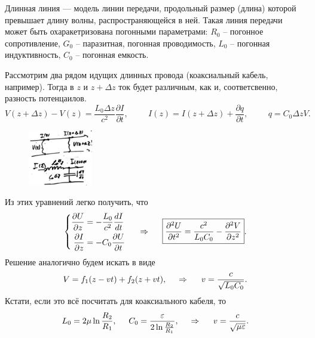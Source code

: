 Длинная линия — модель линии передачи, продольный размер (длина) которой превышает длину волны, распространяющейся в ней. Такая линия передачи может быть охаракетризована погонными параметрами:
$R_0$ -- погонное сопротивление, $G_0$ -- паразитная, погонная проводимость, $L_0$ -- погонная индуктивность, $C_0$ -- погонная емкость.


Рассмотрим два рядом идущих длинных провода (коаксиальный кабель, например). Тогда в $z$ и $z+ \Delta z$ ток будет различным, как и, соответсвенно, разность потенцаилов. 
\begin{equation*}
    V(z+\Delta z) - V(z) = \frac{L_0 \Delta z}{c^2} \frac{\partial I}{\partial t},
    \hspace{1cm} 
    I(z) = I(z+\Delta z) + \frac{\partial q}{\partial t},
    \hspace{1cm} 
    q = C_0 \Delta z V.
\end{equation*}

\begin{figure}[h]
    \centering
    \includegraphics[width=0.25\textwidth]{img/2.png}
\end{figure}

\noindent
Из этих уравнений легко получить, что
\begin{equation}
    \left\{\begin{aligned}
        \frac{\partial U}{\partial z} &= - \frac{L_0}{c^2} \frac{d I}{d t} \\
        \frac{\partial I}{\partial z} &= - C_0 \frac{\partial U}{\partial t} 
    \end{aligned}\right.
    \hspace{0.5cm} \Rightarrow \hspace{0.5cm} 
    \boxed{
        \frac{\partial^2 U}{\partial t^2}  = \frac{c^2}{L_0 C_0} - \frac{\partial^2 V}{\partial z^2} 
    }.
\end{equation}
Решение аналогично будем искать в виде
\begin{equation}
    V = f_1 (z - vt) + f_2 (z + vt),
    \hspace{0.5cm} \Rightarrow \hspace{0.5cm} 
    v = \frac{c}{\sqrt{L_0 C_0}}.
\end{equation}
Кстати, если это всё посчитать для коаксиального кабеля, то
\begin{equation*}
    L_0 = 2 \mu \ln \frac{R_2}{R_1} , \hspace{0.5cm} 
    C_0 = \frac{\varepsilon}{2 \ln \frac{R_2}{R_1} },
    \hspace{0.5cm} \Rightarrow \hspace{0.5cm} 
    v = \frac{c}{\sqrt{\mu \varepsilon}}.
\end{equation*}


